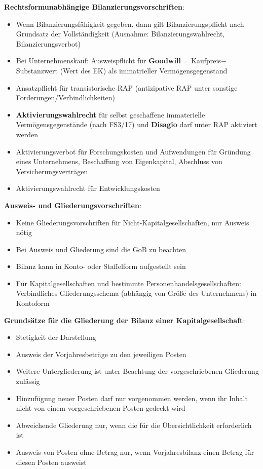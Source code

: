 \bigskip
\textbf{Rechtsformunabhängige Bilanzierungsvorschriften}:
\begin{itemize}
	\item Wenn Bilanzierungsfähigkeit gegeben, dann gilt Bilanzierungspflicht nach Grundsatz der Vollständigkeit (Ausnahme: Bilanzierungswahlrecht, Bilanzierungsverbot)
	\item Bei Unternehmenskauf: Ausweispflicht für \textbf{Goodwill} = Kaufpreis$-$Substanzwert (Wert des EK) als immatrieller Vermögensgegenstand
	\item Ansatzpflicht für transistorische RAP (antizipative RAP unter sonstige Forderungen/Verbindlichkeiten)
	\item \textbf{Aktivierungswahlrecht} für selbst geschaffene immaterielle Vermögensgegenstände (nach FS3/17) und \textbf{Disagio} darf unter RAP aktiviert werden
	\item Aktivierungsverbot für Forschungskosten und Aufwendungen für Gründung eines Unternehmens, Beschaffung von Eigenkapital, Abschluss von Versicherungsverträgen
	\item Aktivierungswahlrecht für Entwicklungskosten
\end{itemize}
\bigskip
\textbf{Ausweis- und Gliederungsvorschriften}:
\begin{itemize}
	\item Keine Gliederungsvorschriften für Nicht-Kapitalgesellschaften, nur Ausweis nötig
	\item Bei Ausweis und Gliederung sind die GoB zu beachten
	\item Bilanz kann in Konto- oder Staffelform aufgestellt sein
	\item Für Kapitalgesellschaften und bestimmte Personenhandelsgesellschaften: Verbindliches Gliederungsschema (abhängig von Größe des Unternehmens) in Kontoform 
\end{itemize}

\textbf{Grundsätze für die Gliederung der Bilanz einer Kapitalgesellschaft}:
\begin{itemize}
	\item Stetigkeit der Darstellung
	\item Ausweis der Vorjahresbeträge zu den jeweiligen Posten
	\item Weitere Untergliederung ist unter Beachtung der vorgeschriebenen Gliederung zulässig
	\item Hinzufügung neuer Posten darf nur vorgenommen werden, wenn ihr Inhalt nicht von einem vorgeschriebenen Posten gedeckt wird
	\item Abweichende Gliederung nur, wenn die für die Übersichtlichkeit erforderlich ist
	\item Ausweis von Posten ohne Betrag nur, wenn Vorjahresbilanz einen Betrag für diesen Posten ausweist
\end{itemize}

